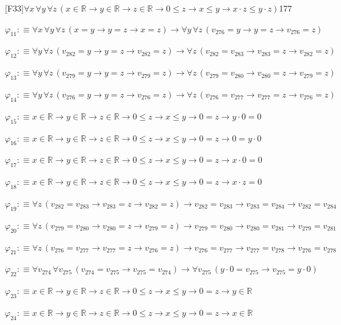 \begin{fullproof}{[F33]}{$\forall x\,\forall y\,\forall z\,(x \in \mathbb{R} \to y \in \mathbb{R} \to z \in \mathbb{R} \to 0 \leq z \to x \leq y \to x \cdot z \leq y \cdot z)$}{177}
\begin{abbrevlist}
\item $\varphi_{11} :\equiv \forall x\,\forall y\,\forall z\,(x = y \to y = z \to x = z) \to \forall y\,\forall z\,(v_{276} = y \to y = z \to v_{276} = z)$
\item $\varphi_{12} :\equiv \forall y\,\forall z\,(v_{282} = y \to y = z \to v_{282} = z) \to \forall z\,(v_{282} = v_{283} \to v_{283} = z \to v_{282} = z)$
\item $\varphi_{13} :\equiv \forall y\,\forall z\,(v_{279} = y \to y = z \to v_{279} = z) \to \forall z\,(v_{279} = v_{280} \to v_{280} = z \to v_{279} = z)$
\item $\varphi_{14} :\equiv \forall y\,\forall z\,(v_{276} = y \to y = z \to v_{276} = z) \to \forall z\,(v_{276} = v_{277} \to v_{277} = z \to v_{276} = z)$
\item $\varphi_{15} :\equiv x \in \mathbb{R} \to y \in \mathbb{R} \to z \in \mathbb{R} \to 0 \leq z \to x \leq y \to 0 = z \to y \cdot 0 = 0$
\item $\varphi_{16} :\equiv x \in \mathbb{R} \to y \in \mathbb{R} \to z \in \mathbb{R} \to 0 \leq z \to x \leq y \to 0 = z \to 0 = y \cdot 0$
\item $\varphi_{17} :\equiv x \in \mathbb{R} \to y \in \mathbb{R} \to z \in \mathbb{R} \to 0 \leq z \to x \leq y \to 0 = z \to x \cdot 0 = 0$
\item $\varphi_{18} :\equiv x \in \mathbb{R} \to y \in \mathbb{R} \to z \in \mathbb{R} \to 0 \leq z \to x \leq y \to 0 = z \to x \cdot z = 0$
\item $\varphi_{19} :\equiv \forall z\,(v_{282} = v_{283} \to v_{283} = z \to v_{282} = z) \to v_{282} = v_{283} \to v_{283} = v_{284} \to v_{282} = v_{284}$
\item $\varphi_{20} :\equiv \forall z\,(v_{279} = v_{280} \to v_{280} = z \to v_{279} = z) \to v_{279} = v_{280} \to v_{280} = v_{281} \to v_{279} = v_{281}$
\item $\varphi_{21} :\equiv \forall z\,(v_{276} = v_{277} \to v_{277} = z \to v_{276} = z) \to v_{276} = v_{277} \to v_{277} = v_{278} \to v_{276} = v_{278}$
\item $\varphi_{22} :\equiv \forall v_{274}\,\forall v_{275}\,(v_{274} = v_{275} \to v_{275} = v_{274}) \to \forall v_{275}\,(y \cdot 0 = v_{275} \to v_{275} = y \cdot 0)$
\item $\varphi_{23} :\equiv x \in \mathbb{R} \to y \in \mathbb{R} \to z \in \mathbb{R} \to 0 \leq z \to x \leq y \to 0 = z \to y \in \mathbb{R}$
\item $\varphi_{24} :\equiv x \in \mathbb{R} \to y \in \mathbb{R} \to z \in \mathbb{R} \to 0 \leq z \to x \leq y \to 0 = z \to x \in \mathbb{R}$

\end{abbrevlist}
\end{fullproof}
